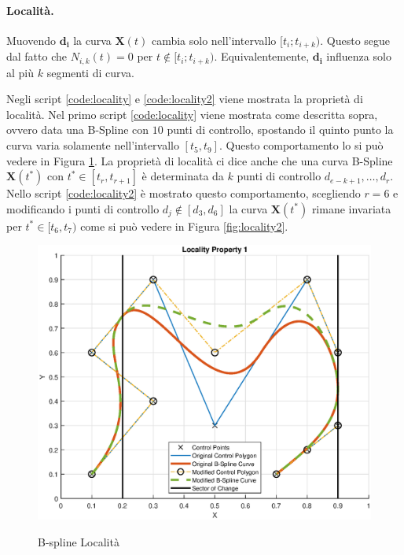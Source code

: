 \documentclass[a4paper, 12pt]{article}
\begin{document}
\paragraph{Località.}
Muovendo $\mathbf{d_i}$ la curva $\mathbf{X}(t)$ cambia solo nell’intervallo $[t_i; t_{i+k})$. Questo segue dal fatto che $N_{i, k}(t) = 0$ per $t \notin [t_i; t_{i+k})$. Equivalentemente, $\mathbf{d_i}$ influenza solo al più $k$ segmenti di curva.

Negli script \ref{code:locality} e \ref{code:locality2} viene mostrata la proprietà di località. Nel primo script \ref{code:locality} viene mostrata come descritta sopra, ovvero data una B-Spline con $10$ punti di controllo, spostando il quinto punto la curva  varia solamente nell'intervallo $[t_5,t_9]$. Questo comportamento lo si può vedere in Figura \ref{fig:locality}. La proprietà di località ci dice anche che una curva B-Spline $\mathbf{X}(t^*)$ con $t^* \in [t_r,t_{r+1}]$ è determinata da $k$ punti di controllo $d_{e-k+1},\dots,d_r$. Nello script \ref{code:locality2} è mostrato questo comportamento, scegliendo $r=6$ e modificando i punti di controllo $d_j \notin [d_3, d_6]$ la curva $\mathbf{X}(t^*)$ rimane invariata per $t^* \in [t_6,t_7)$ come si può vedere in Figura \ref{fig:locality2}.





\begin{figure}[h!]
	\centering
	\caption{B-spline Località}
	\includegraphics[scale=0.55]{plot_locality.eps}
	\label{fig:locality}
\end{figure}
\end{document}
